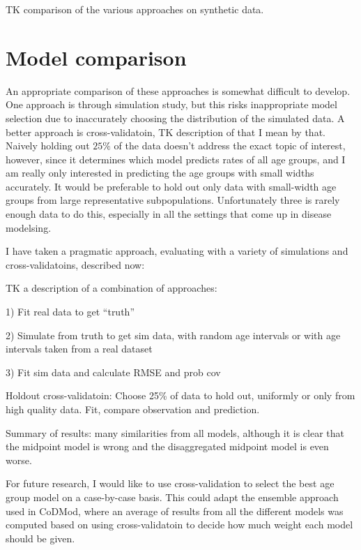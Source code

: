 TK comparison of the various approaches on synthetic data.

\section{Model comparison}
An appropriate comparison of these approaches is somewhat difficult to
develop.  One approach is through simulation study, but this risks
inappropriate model selection due to inaccurately choosing the
distribution of the simulated data.  A better approach is
cross-validatoin, TK description of that I mean by that.  Naively
holding out $25\%$ of the data doesn't address the exact topic of
interest, however, since it determines which model predicts rates of
all age groups, and I am really only interested in predicting the age
groups with small widths accurately.  It would be preferable to hold
out only data with small-width age groups from large representative
subpopulations.  Unfortunately three is rarely enough data to do this,
especially in all the settings that come up in disease modelsing.

I have taken a pragmatic approach, evaluating with a variety of
simulations and cross-validatoins, described now:

TK a description of a combination of approaches:

1) Fit real data to get ``truth''

2) Simulate from truth to get sim data, with random age intervals or
with age intervals taken from a real dataset

3) Fit sim data and calculate RMSE and prob cov

Holdout cross-validatoin:  Choose 25\% of data to hold out, uniformly
or only from high quality data.  Fit, compare observation and
prediction.

Summary of results:  many similarities from all models, although it is
clear that the midpoint model is wrong and the disaggregated midpoint
model is even worse.

For future research, I would like to use cross-validation to select
the best age group model on a case-by-case basis.  This could adapt
the ensemble approach used in CoDMod, where an average of results from
all the different models was computed based on using cross-validatoin
to decide how much weight each model should be given.
